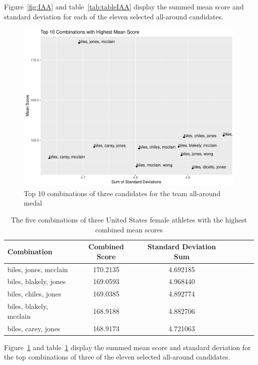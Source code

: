 \documentclass[12pt]{article}
\begin{document}
Figure~\ref{fig:IAA} and table~\ref{tab:tableIAA} display the summed mean score and standard deviation 
for each of the eleven selected all-around candidates.

\begin{figure}[tbp]
  \centering
  \includegraphics[scale=0.6]{TeamCombinations3.pdf}
  \caption{Top 10 combinations of three candidates for the team all-around medal}
  \label{fig:AA3}
\end{figure}

\begin{table}[tbp]
  \caption{The five combinations of three United States female athletes with the highest combined mean scores}
  \label{tab:tableAA3}
\centering
\begin{tabular}[t]{lccllll}
 \toprule
Combination & Combined Score & Standard Deviation Sum\\
\midrule
biles, jones, mcclain & 170.2135 & 4.692185\\
\midrule
biles, blakely, jones & 169.0593 & 4.968440\\
\midrule
biles, chiles, jones & 169.0385 & 4.892774\\
\midrule
biles, blakely, mcclain & 168.9188 & 4.882706\\
\midrule
biles, carey, jones
& 168.9173 & 4.721063
\\
\bottomrule
\end{tabular}
\end{table} 

Figure~\ref{fig:AA3} and table~\ref{tab:tableAA3} display the summed mean score and standard deviation 
for the top combinations of three of the eleven selected all-around candidates.
\end{document}
